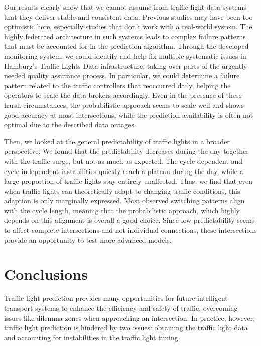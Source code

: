 \begin{Summary}
Our results clearly show that we cannot assume from traffic light data systems that they deliver stable and consistent data. Previous studies may have been too optimistic here, especially studies that don’t work with a real-world system. The highly federated architecture in such systems leads to complex failure patterns that must be accounted for in the prediction algorithm. Through the developed monitoring system, we could identify and help fix multiple systematic issues in Hamburg’s Traffic Lights Data infrastructure, taking over parts of the urgently needed quality assurance process. In particular, we could determine a failure pattern related to the traffic controllers that reoccurred daily, helping the operators to scale the data brokers accordingly. Even in the presence of these harsh circumstances, the probabilistic approach seems to scale well and shows good accuracy at most intersections, while the prediction availability is often not optimal due to the described data outages.

Then, we looked at the general predictability of traffic lights in a broader perspective. We found that the predictability decreases during the day together with the traffic surge, but not as much as expected. The cycle-dependent and cycle-independent instabilities quickly reach a plateau during the day, while a large proportion of traffic lights stay entirely unaffected. Thus, we find that even when traffic lights can theoretically adapt to changing traffic conditions, this adaption is only marginally expressed. Most observed switching patterns align with the cycle length, meaning that the probabilistic approach, which highly depends on this alignment is overall a good choice. Since low predictability seems to affect complete intersections and not individual connections, these intersections provide an opportunity to test more advanced models.
\end{Summary}

\section{Conclusions}

Traffic light prediction provides many opportunities for future intelligent transport systems to enhance the efficiency and safety of traffic, overcoming issues like dilemma zones when approaching an intersection. In practice, however, traffic light prediction is hindered by two issues: obtaining the traffic light data and accounting for instabilities in the traffic light timing. 

